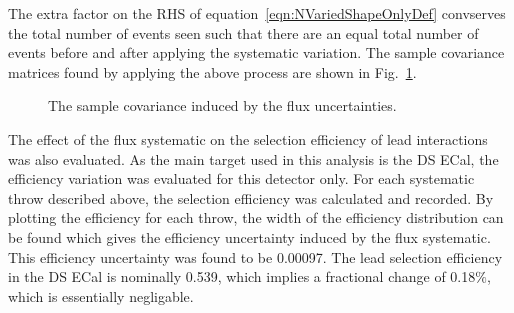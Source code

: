 The extra factor on the RHS of equation~\ref{eqn:NVariedShapeOnlyDef} convserves the total number of events seen such that there are an equal total number of events before and after applying the systematic variation.  The sample covariance matrices found by applying the above process are shown in Fig.~\ref{fig:FluxCovarianceMatrices}.
\begin{figure}%
  \centering
  \caption{The sample covariance induced by the flux uncertainties.}
  \label{fig:FluxCovarianceMatrices}
\end{figure}
\newline
\newline
The effect of the flux systematic on the selection efficiency of lead interactions was also evaluated.  As the main target used in this analysis is the DS ECal, the efficiency variation was evaluated for this detector only.  For each systematic throw described above, the selection efficiency was calculated and recorded.  By plotting the efficiency for each throw, the width of the efficiency distribution can be found which gives the efficiency uncertainty induced by the flux systematic.  This efficiency uncertainty was found to be 0.00097.  The lead selection efficiency in the DS ECal is nominally 0.539, which implies a fractional change of 0.18$\%$, which is essentially negligable.
